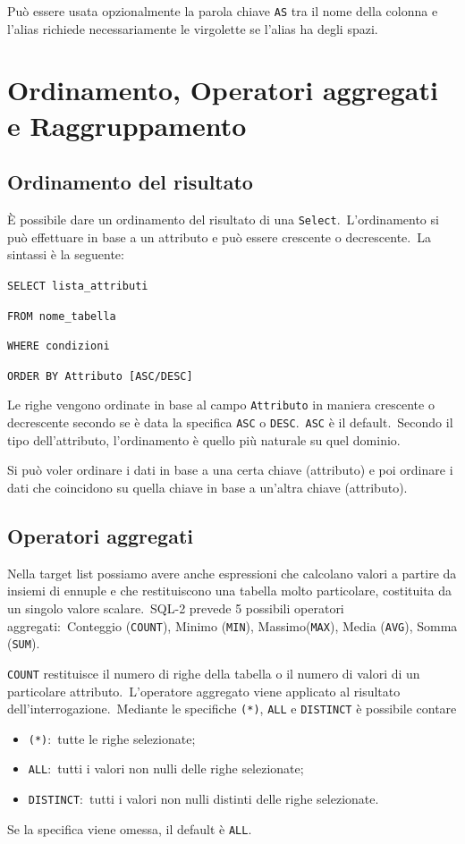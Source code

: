 Può essere usata opzionalmente la parola chiave \texttt{AS} tra il nome della colonna e l'alias richiede necessariamente le virgolette se l'alias ha degli spazi.

\section{Ordinamento, Operatori aggregati e Raggruppamento}

\subsection{Ordinamento del risultato}

È possibile dare un ordinamento del risultato di una \texttt{Select}.\
L'ordinamento si può effettuare in base a un attributo e può essere crescente o decrescente.\
La sintassi è la seguente:

\begin{flushleft}
	\texttt{SELECT lista\_attributi}

	\texttt{FROM nome\_tabella}

	\texttt{WHERE condizioni}

	\texttt{ORDER BY Attributo [ASC/DESC]}
\end{flushleft}

\noindent Le righe vengono ordinate in base al campo \texttt{Attributo} in maniera crescente o decrescente secondo se è data la specifica \texttt{ASC} o \texttt{DESC}.\
\texttt{ASC} è il default.\
Secondo il tipo dell'attributo, l'ordinamento è quello più naturale su quel dominio.

Si può voler ordinare i dati in base a una certa chiave (attributo) e poi ordinare i dati che coincidono su quella chiave in base a un'altra chiave (attributo).

\subsection{Operatori aggregati}

Nella target list possiamo avere anche espressioni che calcolano valori a partire da insiemi di ennuple e che restituiscono una tabella molto particolare, costituita da un singolo valore scalare.\
SQL-2 prevede 5 possibili operatori aggregati:\ Conteggio (\texttt{COUNT}), Minimo (\texttt{MIN}), Massimo(\texttt{MAX}), Media (\texttt{AVG}), Somma (\texttt{SUM}).

\texttt{COUNT} restituisce il numero di righe della tabella o il numero di valori di un particolare attributo.\
L'operatore aggregato viene applicato al risultato dell'interrogazione.\
Mediante le specifiche \texttt{(*)}, \texttt{ALL} e \texttt{DISTINCT} è possibile contare
\begin{itemize}
	\item \texttt{(*)}:\ tutte le righe selezionate;
	\item \texttt{ALL}:\ tutti i valori non nulli delle righe selezionate;
	\item \texttt{DISTINCT}:\ tutti i valori non nulli distinti delle righe selezionate.
\end{itemize}
Se la specifica viene omessa, il default è \texttt{ALL}.\

